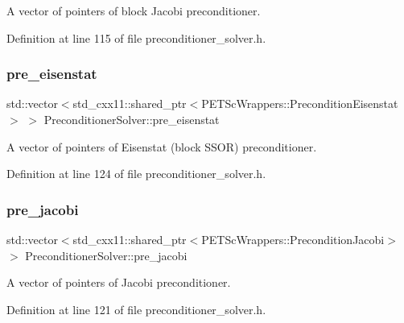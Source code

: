 A vector of pointers of block Jacobi preconditioner. 



Definition at line 115 of file preconditioner\+\_\+solver.\+h.

\mbox{\label{class_preconditioner_solver_aab4bd157aebca7681283ff6cf0e69392}} 
\subsubsection{\texorpdfstring{pre\+\_\+eisenstat}{pre\_eisenstat}}
{\footnotesize\ttfamily std\+::vector$<$std\+\_\+cxx11\+::shared\+\_\+ptr$<$P\+E\+T\+Sc\+Wrappers\+::\+Precondition\+Eisenstat$>$ $>$ Preconditioner\+Solver\+::pre\+\_\+eisenstat\hspace{0.3cm}{\ttfamily [private]}}



A vector of pointers of Eisenstat (block S\+S\+OR) preconditioner. 



Definition at line 124 of file preconditioner\+\_\+solver.\+h.

\mbox{\label{class_preconditioner_solver_ab2379323cfbca020045ec5dd4ab708dc}} 
\subsubsection{\texorpdfstring{pre\+\_\+jacobi}{pre\_jacobi}}
{\footnotesize\ttfamily std\+::vector$<$std\+\_\+cxx11\+::shared\+\_\+ptr$<$P\+E\+T\+Sc\+Wrappers\+::\+Precondition\+Jacobi$>$ $>$ Preconditioner\+Solver\+::pre\+\_\+jacobi\hspace{0.3cm}{\ttfamily [private]}}



A vector of pointers of Jacobi preconditioner. 



Definition at line 121 of file preconditioner\+\_\+solver.\+h.

\mbox{\label{class_preconditioner_solver_a90b15442f60786b56729f2756e191336}} 

